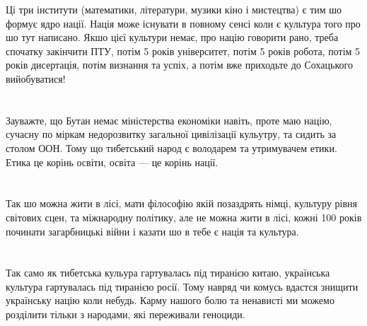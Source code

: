 Ці три інститути (математики, літератури, музики кіно і мистецтва) є тим шо формує ядро нації. Нація може існувати в повному сенсі коли є культура того про шо тут написано. Якшо цієї культури немає, про націю говорити рано, треба спочатку закінчити ПТУ, потім 5 років університет, потім 5 років робота, потім 5 років дисертація, потім визнання та успіх, а потім вже приходьте до Сохацького вийобуватися!\\
\\
\\
Зауважте, що Бутан немає міністерства економіки навіть, проте маю націю, сучасну по міркам недорозвитку загальної цивілізації кульутру, та сидить за столом ООН. Тому що тибетський народ є володарем та утримувачем етики. Етика це корінь освіти, освіта — це корінь нації.\\
\\
\\
Так шо можна жити в лісі, мати філософію якій позаздрять німці, культуру рівня світових сцен, та міжнародну політику, але не можна жити в лісі, кожні 100 років починати загарбницькі війни і казати шо в тебе є нація та культура.\\
\\
\\
Так само як тибетська кульура гартувалась під тиранією китаю, українська культура гартувалась під тиранією росії. Тому навряд чи комусь вдастся знищити українську націю коли небудь. Карму нашого болю та ненависті ми можемо розділити тільки з народами, які переживали геноциди.\\

\normalsize
